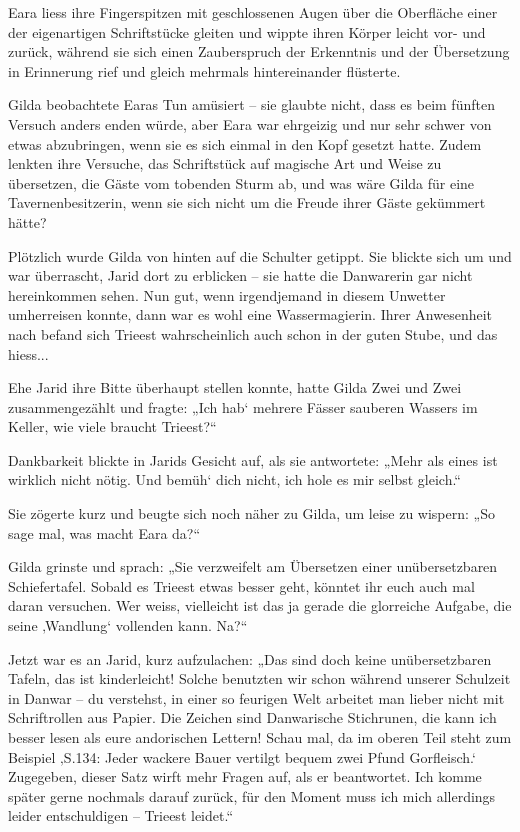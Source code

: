 Eara liess ihre Fingerspitzen mit geschlossenen Augen über die Oberfläche einer der eigenartigen Schriftstücke gleiten und wippte ihren Körper leicht vor- und zurück, während sie sich einen Zauberspruch der Erkenntnis und der Übersetzung in Erinnerung rief und gleich mehrmals hintereinander flüsterte.

Gilda beobachtete Earas Tun amüsiert – sie glaubte nicht, dass es beim fünften Versuch anders enden würde, aber Eara war ehrgeizig und nur sehr schwer von etwas abzubringen, wenn sie es sich einmal in den Kopf gesetzt hatte. Zudem lenkten ihre Versuche, das Schriftstück auf magische Art und Weise zu übersetzen, die Gäste vom tobenden Sturm ab, und was wäre Gilda für eine Tavernenbesitzerin, wenn sie sich nicht um die Freude ihrer Gäste gekümmert hätte?

Plötzlich wurde Gilda von hinten auf die Schulter getippt. Sie blickte sich um und war überrascht, Jarid dort zu erblicken – sie hatte die Danwarerin gar nicht hereinkommen sehen. Nun gut, wenn irgendjemand in diesem Unwetter umherreisen konnte, dann war es wohl eine Wassermagierin. Ihrer Anwesenheit nach befand sich Trieest wahrscheinlich auch schon in der guten Stube, und das hiess...

Ehe Jarid ihre Bitte überhaupt stellen konnte, hatte Gilda Zwei und Zwei zusammengezählt und fragte: „Ich hab‘ mehrere Fässer sauberen Wassers im Keller, wie viele braucht Trieest?“

Dankbarkeit blickte in Jarids Gesicht auf, als sie antwortete: „Mehr als eines ist wirklich nicht nötig. Und bemüh‘ dich nicht, ich hole es mir selbst gleich.“

Sie zögerte kurz und beugte sich noch näher zu Gilda, um leise zu wispern: „So sage mal, was macht Eara da?“

Gilda grinste und sprach: „Sie verzweifelt am Übersetzen einer unübersetzbaren Schiefertafel. Sobald es Trieest etwas besser geht, könntet ihr euch auch mal daran versuchen. Wer weiss, vielleicht ist das ja gerade die glorreiche Aufgabe, die seine ‚Wandlung‘ vollenden kann. Na?“

Jetzt war es an Jarid, kurz aufzulachen: „Das sind doch keine unübersetzbaren Tafeln, das ist kinderleicht! Solche benutzten wir schon während unserer Schulzeit in Danwar – du verstehst, in einer so feurigen Welt arbeitet man lieber nicht mit Schriftrollen aus Papier. Die Zeichen sind Danwarische Stichrunen, die kann ich besser lesen als eure andorischen Lettern! Schau mal, da im oberen Teil steht zum Beispiel ‚S.134: Jeder wackere Bauer vertilgt bequem zwei Pfund Gorfleisch.‘ Zugegeben, dieser Satz wirft mehr Fragen auf, als er beantwortet. Ich komme später gerne nochmals darauf zurück, für den Moment muss ich mich allerdings leider entschuldigen – Trieest leidet.“

